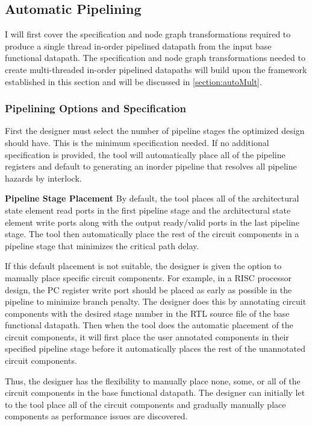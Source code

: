\subsection{Automatic Pipelining}
\label{section:autoPipe}
I will first cover the specification and node graph transformations required to produce a single thread in-order pipelined datapath from the input base functional datapath. The specification and node graph transformations needed to create multi-threaded in-order pipelined datapaths will build upon the framework established in this section and will be discussed in \ref{section:autoMult}.

\subsubsection{Pipelining Options and Specification}
\label{section:pipelineOptions}
First the designer must select the number of pipeline stages the optimized design should have. This is the minimum specification needed. If no additional specification is provided, the tool will automatically place all of the pipeline registers and default to generating an inorder pipeline that resolves all pipeline hazards by interlock.

{\bf Pipeline Stage Placement}
By default, the tool places all of the architectural state element read ports in the first pipeline stage and the architectural state element write ports along with the output ready/valid ports in the last pipeline stage. The tool then automatically place the rest of the circuit components in a pipeline stage that minimizes the critical path delay.

If this default placement is not suitable, the designer is given the option to manually place specific circuit components. For example, in a RISC processor design, the PC register write port should be placed as early as possible in the pipeline to minimize branch penalty. The designer does this by annotating circuit components with the desired stage number in the RTL source file of the base functional datapath. Then when the tool does the automatic placement of the circuit components, it will first place the user annotated components in their specified pipeline stage before it automatically places the rest of the unannotated circuit components. 

Thus, the designer has the flexibility to manually place none, some, or all of the circuit components in the base functional datapath. The designer can initially let to the tool place all of the circuit components and gradually manually place components as performance issues are discovered.

